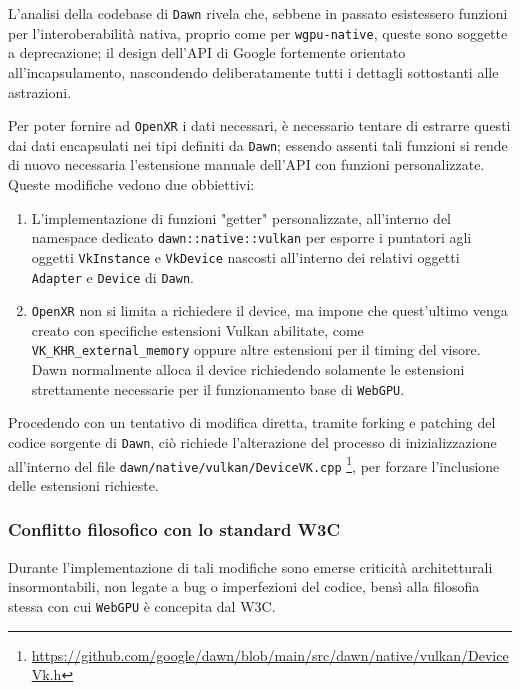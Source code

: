 \documentclass[a4paper, 11pt, twoside]{report}
\begin{document}
L'analisi della codebase di \texttt{Dawn} rivela che, sebbene in passato esistessero funzioni per l'interoberabilità
nativa, proprio come per \texttt{wgpu-native}, queste sono soggette a deprecazione; il design dell'API di Google
fortemente orientato all'incapsulamento, nascondendo deliberatamente tutti i dettagli sottostanti alle astrazioni.

Per poter fornire ad \texttt{\gls{OpenXR}} i dati necessari, è necessario tentare di estrarre questi dai dati
encapsulati nei tipi definiti da \texttt{Dawn}; essendo assenti tali funzioni si rende di nuovo necessaria l'estensione
manuale dell'API con funzioni personalizzate. Queste modifiche vedono due obbiettivi:

\begin{enumerate}
    \item L'implementazione di funzioni "getter" personalizzate, all'interno del \gls{namespace} dedicato
        \texttt{dawn::native::vulkan} per esporre i puntatori agli oggetti \texttt{VkInstance} e \texttt{VkDevice}
        nascosti all'interno dei relativi oggetti \texttt{Adapter} e \texttt{Device} di \texttt{Dawn}.
    \item \texttt{\gls{OpenXR}} non si limita a richiedere il device, ma impone che quest'ultimo venga creato con
        specifiche estensioni \gls{Vulkan} abilitate, come \texttt{VK\_KHR\_external\_memory} oppure altre estensioni
        per il timing del visore. Dawn normalmente alloca il device richiedendo solamente le estensioni strettamente
        necessarie per il funzionamento base di \texttt{WebGPU}.
\end{enumerate}

Procedendo con un tentativo di modifica diretta, tramite forking e patching del codice sorgente di \texttt{Dawn}, ciò
richiede l'alterazione del processo di inizializzazione all'interno del file \texttt{dawn/native/vulkan/DeviceVK.cpp}
\footnote{\url{https://github.com/google/dawn/blob/main/src/dawn/native/vulkan/DeviceVk.h}},
per forzare l'inclusione delle estensioni richieste.

\subsubsection{Conflitto filosofico con lo standard W3C}

Durante l'implementazione di tali modifiche sono emerse criticità architetturali insormontabili, non legate a bug o
imperfezioni del codice, bensì alla filosofia stessa con cui \texttt{WebGPU} è concepita dal W3C.
\end{document}
